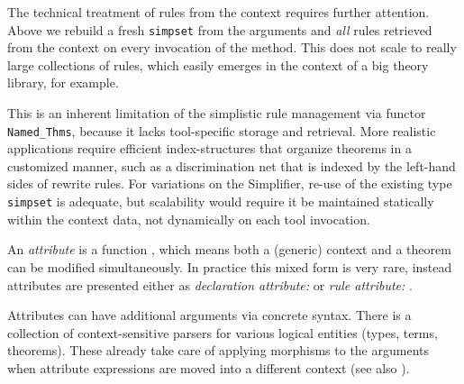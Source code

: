 \begin{isabellebody}
\begin{isamarkuptext}
  \medskip The technical treatment of rules from the context requires
  further attention.  Above we rebuild a fresh \verb|simpset| from
  the arguments and \emph{all} rules retrieved from the context on
  every invocation of the method.  This does not scale to really large
  collections of rules, which easily emerges in the context of a big
  theory library, for example.

  This is an inherent limitation of the simplistic rule management via
  functor \verb|Named_Thms|, because it lacks tool-specific
  storage and retrieval.  More realistic applications require
  efficient index-structures that organize theorems in a customized
  manner, such as a discrimination net that is indexed by the
  left-hand sides of rewrite rules.  For variations on the Simplifier,
  re-use of the existing type \verb|simpset| is adequate, but
  scalability would require it be maintained statically within the
  context data, not dynamically on each tool invocation.%
\end{isamarkuptext}%
\isamarkuptrue%
%
\isamarkuptrue%
%
\begin{isamarkuptext}%
An \emph{attribute} is a function , which means both a (generic) context and a theorem
  can be modified simultaneously.  In practice this mixed form is very
  rare, instead attributes are presented either as \emph{declaration
  attribute:}  or \emph{rule
  attribute:} .

  Attributes can have additional arguments via concrete syntax.  There
  is a collection of context-sensitive parsers for various logical
  entities (types, terms, theorems).  These already take care of
  applying morphisms to the arguments when attribute expressions are
  moved into a different context (see also ).


\end{isamarkuptext}
\end{isabellebody}
